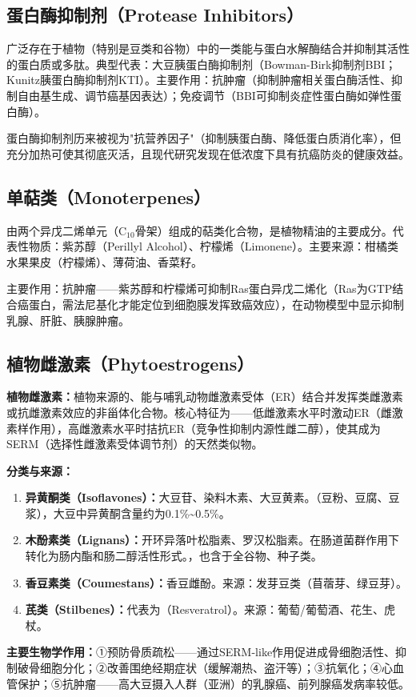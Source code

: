 \subsection{蛋白酶抑制剂（Protease Inhibitors）}

广泛存在于植物（特别是豆类和谷物）中的一类能与蛋白水解酶结合并抑制其活性的蛋白质或多肽。典型代表：大豆胰蛋白酶抑制剂（Bowman-Birk抑制剂BBI；Kunitz胰蛋白酶抑制剂KTI）。主要作用：抗肿瘤（抑制肿瘤相关蛋白酶活性、抑制自由基生成、调节癌基因表达）；免疫调节（BBI可抑制炎症性蛋白酶如弹性蛋白酶）。

蛋白酶抑制剂历来被视为"抗营养因子"（抑制胰蛋白酶、降低蛋白质消化率），但充分加热可使其彻底灭活，且现代研究发现在低浓度下具有抗癌防炎的健康效益。

\subsection{单萜类（Monoterpenes）}

由两个异戊二烯单元（C$_{10}$骨架）组成的萜类化合物，是植物精油的主要成分。代表性物质：紫苏醇（Perillyl Alcohol）、柠檬烯（Limonene）。主要来源：柑橘类水果果皮（柠檬烯）、薄荷油、香菜籽。

主要作用：抗肿瘤——紫苏醇和柠檬烯可抑制Ras蛋白异戊二烯化（Ras为GTP结合癌蛋白，需法尼基化才能定位到细胞膜发挥致癌效应），在动物模型中显示抑制乳腺、肝脏、胰腺肿瘤。

\subsection{植物雌激素（Phytoestrogens）}

\begin{keybox}
\textbf{植物雌激素：}植物来源的、能与哺乳动物雌激素受体（ER）结合并发挥类雌激素或抗雌激素效应的非甾体化合物。核心特征为——低雌激素水平时激动ER（雌激素样作用），高雌激素水平时拮抗ER（竞争性抑制内源性雌二醇），使其成为SERM（选择性雌激素受体调节剂）的天然类似物。

\textbf{分类与来源：}
\begin{enumerate}[leftmargin=*]
    \item \textbf{异黄酮类（Isoflavones）：}大豆苷、染料木素、大豆黄素。（豆粉、豆腐、豆浆），大豆中异黄酮含量约为0.1\%\~{}0.5\%。
    \item \textbf{木酚素类（Lignans）：}开环异落叶松脂素、罗汉松脂素。在肠道菌群作用下转化为肠内酯和肠二醇活性形式。，也含于全谷物、种子类。
    \item \textbf{香豆素类（Coumestans）：}香豆雌酚。来源：发芽豆类（苜蓿芽、绿豆芽）。
    \item \textbf{芪类（Stilbenes）：}代表为（Resveratrol）。来源：葡萄/葡萄酒、花生、虎杖。
\end{enumerate}

\textbf{主要生物学作用：}①预防骨质疏松——通过SERM-like作用促进成骨细胞活性、抑制破骨细胞分化；②改善围绝经期症状（缓解潮热、盗汗等）；③抗氧化；④心血管保护；⑤抗肿瘤——高大豆摄入人群（亚洲）的乳腺癌、前列腺癌发病率较低。
\end{keybox}

